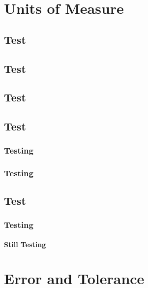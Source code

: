 \documentclass[
  11pt,
  openany]{book}
\begin{document}
\chapter{Units of Measure}\label{units-of-measure}

\section{Test}\label{test}

\section{Test}\label{test-1}

\section{Test}\label{test-2}

\section{Test}\label{test-3}

\subsection{Testing}\label{testing}

\subsection{Testing}\label{testing-1}

\section{Test}\label{test-4}

\subsection{Testing}\label{testing-2}

\subsubsection{Still Testing}\label{still-testing}

\chapter{Error and Tolerance}\label{error-and-tolerance}
\end{document}
